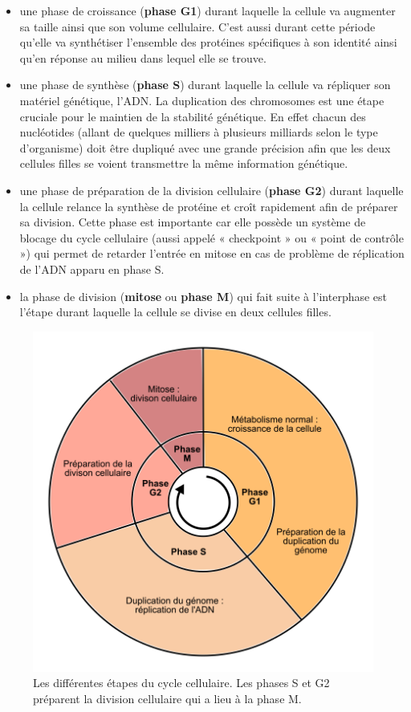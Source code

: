 \documentclass[12pt,a4paper,twoside,openright]{book}
\begin{document}
\begin{itemize}
\item
  une phase de croissance (\textbf{phase G1}) durant laquelle la cellule
  va augmenter sa taille ainsi que son volume cellulaire. C'est aussi
  durant cette période qu'elle va synthétiser l'ensemble des protéines
  spécifiques à son identité ainsi qu'en réponse au milieu dans lequel
  elle se trouve.
\item
  une phase de synthèse (\textbf{phase S}) durant laquelle la cellule va
  répliquer son matériel génétique, l'ADN. La duplication des
  chromosomes est une étape cruciale pour le maintien de la stabilité
  génétique. En effet chacun des nucléotides (allant de quelques
  milliers à plusieurs milliards selon le type d'organisme) doit être
  dupliqué avec une grande précision afin que les deux cellules filles
  se voient transmettre la même information génétique.
\item
  une phase de préparation de la division cellulaire (\textbf{phase G2})
  durant laquelle la cellule relance la synthèse de protéine et croît
  rapidement afin de préparer sa division. Cette phase est importante
  car elle possède un système de blocage du cycle cellulaire (aussi
  appelé « checkpoint » ou « point de contrôle ») qui permet de retarder
  l'entrée en mitose en cas de problème de réplication de l'ADN apparu
  en phase S.
\item
  la phase de division (\textbf{mitose} ou \textbf{phase M}) qui fait
  suite à l'interphase est l'étape durant laquelle la cellule se divise
  en deux cellules filles.
\end{itemize}

\begin{figure}[htbp]
\centering
\includegraphics{figures/intro/cycle.png}
\caption[Les différentes étapes du cycle cellulaire]{\label{fig:cycle}Les
différentes étapes du cycle cellulaire. Les phases S et G2 préparent la
division cellulaire qui a lieu à la phase M.}
\end{figure}
\end{document}
